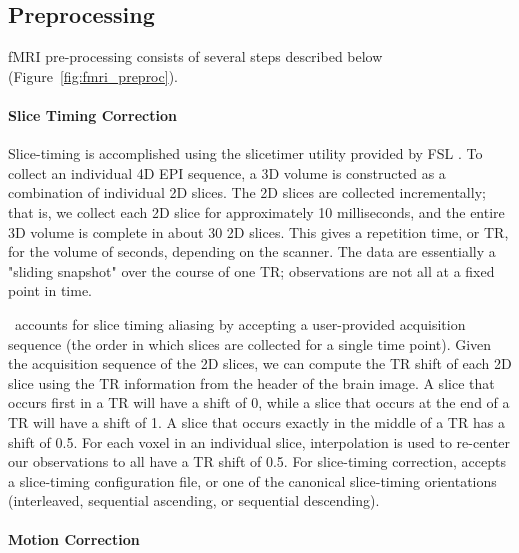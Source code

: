 \documentclass[11pt]{article}
\begin{document}
\subsection{Preprocessing}
\label{app:fprep}



fMRI pre-processing consists of several steps described below (Figure~\ref{fig:fmri_preproc}).


\paragraph{Slice Timing Correction}

Slice-timing is accomplished using the slicetimer utility provided by FSL \cite{Woolrich2009}.
To collect an individual 4D EPI sequence, a 3D volume is constructed as a combination of individual 2D slices. The 2D slices are collected incrementally; that is, we collect each 2D slice for approximately 10 milliseconds, and the entire 3D volume is complete in about 30 2D slices. This gives a repetition time, or TR, for the volume of seconds, depending on the scanner. 
The data are essentially a "sliding snapshot" over the course of one TR; observations are not all at a fixed point in time.

\ndmgf~accounts for slice timing aliasing by accepting a user-provided acquisition sequence (the order in which slices are collected for a single time point). Given the acquisition sequence of the 2D slices, we can compute the TR shift of each 2D slice using the TR information from the header of the brain image. A slice that occurs first in a TR will have a shift of 0, while a slice that occurs at the end of a TR will have a shift of 1. A slice that occurs exactly in the middle of a TR has a shift of 0.5. For each voxel in an individual slice, interpolation is used to re-center our observations to all have a TR shift of 0.5. For slice-timing correction, \ndmgf accepts a slice-timing configuration file, or one of the canonical slice-timing orientations (interleaved, sequential ascending, or sequential descending).

\paragraph{Motion Correction}
\end{document}
